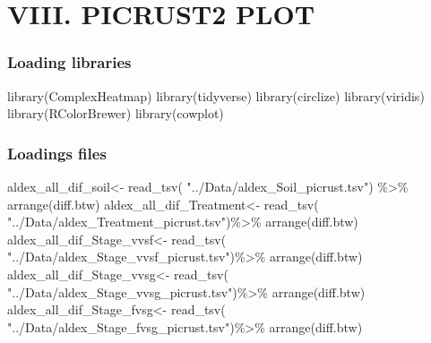 \documentclass[]{interact}
\theoremstyle{plain}%
\theoremstyle{definition}
\theoremstyle{remark}
\newenvironment{Shaded}{\begin{snugshade}}{\end{snugshade}}
\newcommand{\FunctionTok}[1]{\textcolor[rgb]{0.00,0.00,0.00}{#1}}
\newcommand{\NormalTok}[1]{#1}
\newcommand{\OtherTok}[1]{\textcolor[rgb]{0.56,0.35,0.01}{#1}}
\newcommand{\SpecialCharTok}[1]{\textcolor[rgb]{0.00,0.00,0.00}{#1}}
\newcommand{\StringTok}[1]{\textcolor[rgb]{0.31,0.60,0.02}{#1}}
\begin{document}
\hypertarget{viii.-picrust2-plot}{%
\section{VIII. PICRUST2 PLOT}\label{viii.-picrust2-plot}}

\hypertarget{loading-libraries-6}{%
\subsubsection{Loading libraries}\label{loading-libraries-6}}

\begin{Shaded}
\begin{Highlighting}[]
\FunctionTok{library}\NormalTok{(ComplexHeatmap)}
\FunctionTok{library}\NormalTok{(tidyverse)}
\FunctionTok{library}\NormalTok{(circlize)}
\FunctionTok{library}\NormalTok{(viridis)}
\FunctionTok{library}\NormalTok{(RColorBrewer)}
\FunctionTok{library}\NormalTok{(cowplot)}
\end{Highlighting}
\end{Shaded}

\hypertarget{loadings-files}{%
\subsubsection{Loadings files}\label{loadings-files}}

\begin{Shaded}
\begin{Highlighting}[]
\NormalTok{aldex\_all\_dif\_soil}\OtherTok{\textless{}{-}} \FunctionTok{read\_tsv}\NormalTok{( }\StringTok{"../Data/aldex\_Soil\_picrust.tsv"}\NormalTok{) }\SpecialCharTok{\%\textgreater{}\%} \FunctionTok{arrange}\NormalTok{(diff.btw)}
\NormalTok{aldex\_all\_dif\_Treatment}\OtherTok{\textless{}{-}} \FunctionTok{read\_tsv}\NormalTok{( }\StringTok{"../Data/aldex\_Treatment\_picrust.tsv"}\NormalTok{)}\SpecialCharTok{\%\textgreater{}\%} \FunctionTok{arrange}\NormalTok{(diff.btw)}
\NormalTok{aldex\_all\_dif\_Stage\_vvsf}\OtherTok{\textless{}{-}} \FunctionTok{read\_tsv}\NormalTok{( }\StringTok{"../Data/aldex\_Stage\_vvsf\_picrust.tsv"}\NormalTok{)}\SpecialCharTok{\%\textgreater{}\%} \FunctionTok{arrange}\NormalTok{(diff.btw)}
\NormalTok{aldex\_all\_dif\_Stage\_vvsg}\OtherTok{\textless{}{-}} \FunctionTok{read\_tsv}\NormalTok{( }\StringTok{"../Data/aldex\_Stage\_vvsg\_picrust.tsv"}\NormalTok{)}\SpecialCharTok{\%\textgreater{}\%} \FunctionTok{arrange}\NormalTok{(diff.btw)}
\NormalTok{aldex\_all\_dif\_Stage\_fvsg}\OtherTok{\textless{}{-}} \FunctionTok{read\_tsv}\NormalTok{( }\StringTok{"../Data/aldex\_Stage\_fvsg\_picrust.tsv"}\NormalTok{)}\SpecialCharTok{\%\textgreater{}\%} \FunctionTok{arrange}\NormalTok{(diff.btw)}
\end{Highlighting}
\end{Shaded}
\end{document}
